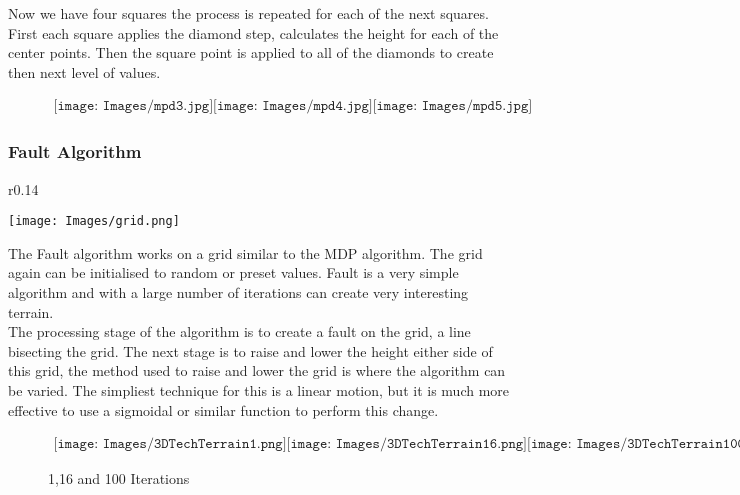 Now we have four squares the process is repeated for each of the next squares. First
each square applies the diamond step, calculates the height for each of the center 
points. Then the square point is applied to all of the diamonds to create then next
level of values.\\

\begin{figure}[h!]
\begin{center}$
\begin{array}{cc}
\texttt{[image: Images/mpd3.jpg]}
\texttt{[image: Images/mpd4.jpg]}
\texttt{[image: Images/mpd5.jpg]}
\end{array}$
\end{center}
\end{figure}

\subsubsection*{Fault Algorithm}

\begin{wrapfigure}{r}{0.14\textwidth}
	\vspace{-40pt}
	\begin{center}
		\texttt{[image: Images/grid.png]}
	\end{center}
\end{wrapfigure}
The Fault algorithm\cite{Fault} works on a grid similar to the MDP algorithm. The grid again can
be initialised to random or preset values. Fault is a very simple algorithm and with
a large number of iterations can create very interesting terrain. \\

The processing stage of the algorithm is to create a fault on the grid, a line 
bisecting the grid. The next stage is to raise and lower the height either side of
this grid, the method used to raise and lower the grid is where the algorithm can be 
varied. The simpliest technique for this is a linear motion, but it is much more 
effective to use a sigmoidal or similar function to perform this change.\\

\begin{figure}[h!]
	\begin{center}$
		\begin{array}{cc}
			\texttt{[image: Images/3DTechTerrain1.png]}
			\texttt{[image: Images/3DTechTerrain16.png]}
			\texttt{[image: Images/3DTechTerrain100.png]}
		\end{array}$
	\end{center}
	\caption{1,16 and 100 Iterations}
\end{figure}

